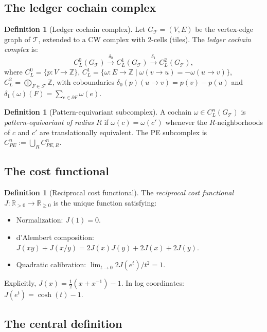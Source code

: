 \documentclass[12pt]{article}
\theoremstyle{definition}
\newtheorem{definition}[theorem]{Definition}
\theoremstyle{remark}
\newcommand{\RR}{\mathbb{R}}
\newcommand{\ZZ}{\mathbb{Z}}
\begin{document}
\subsection{The ledger cochain complex}

\begin{definition}[Ledger cochain complex]
\label{def:ledger-complex}
Let $G_{\mathcal{T}} = (V, E)$ be the vertex-edge graph of $\mathcal{T}$, extended to a CW complex with 2-cells (tiles). The \emph{ledger cochain complex} is:
\[
C^0_L(G_{\mathcal{T}}) \xrightarrow{\;\delta_0\;} C^1_L(G_{\mathcal{T}}) \xrightarrow{\;\delta_1\;} C^2_L(G_{\mathcal{T}}),
\]
where $C^0_L = \{p: V \to \ZZ\}$, $C^1_L = \{\omega: E \to \ZZ \mid \omega(v \to u) = -\omega(u \to v)\}$, $C^2_L = \bigoplus_{F \in \mathcal{F}} \ZZ$, with coboundaries $\delta_0(p)(u \to v) = p(v) - p(u)$ and $\delta_1(\omega)(F) = \sum_{e \in \partial F} \omega(e)$.
\end{definition}

\begin{definition}[Pattern-equivariant subcomplex]
\label{def:PE}
A cochain $\omega \in C^n_L(G_{\mathcal{T}})$ is \emph{pattern-equivariant of radius $R$} if $\omega(c) = \omega(c')$ whenever the $R$-neighborhoods of $c$ and $c'$ are translationally equivalent. The PE subcomplex is $C^n_{PE} := \bigcup_R C^n_{PE,R}$.
\end{definition}

\subsection{The cost functional}

\begin{definition}[Reciprocal cost functional]
\label{def:J}
The \emph{reciprocal cost functional} $J: \RR_{>0} \to \RR_{\geq 0}$ is the unique function satisfying:
\begin{itemize}
\item[(A1)] Normalization: $J(1) = 0$.
\item[(A2)] d'Alembert composition: $J(xy) + J(x/y) = 2J(x)J(y) + 2J(x) + 2J(y)$.
\item[(A3)] Quadratic calibration: $\lim_{t \to 0} 2J(e^t)/t^2 = 1$.
\end{itemize}
Explicitly, $J(x) = \frac{1}{2}(x + x^{-1}) - 1$. In log coordinates: $J(e^t) = \cosh(t) - 1$.
\end{definition}

\subsection{The central definition}
\end{document}

